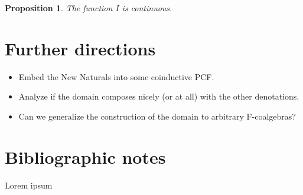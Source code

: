 \documentclass[a4paper]{article}
\newtheorem{thmIIsContinuous}[defNuF]{Proposition}
\begin{document}
\begin{thmIIsContinuous}

The function $I$ is continuous.

\end{thmIIsContinuous}

\section{Further directions}

\begin{itemize}
\item Embed the New Naturals into some coinductive PCF.
\item Analyze if the domain composes nicely (or at all) with the other
denotations.
\item Can we generalize the construction of the domain to arbitrary
F-coalgebras?
\end{itemize}

\section{Bibliographic notes}

Lorem ipsum \cite{Pierce1991} \cite{Gunter1992} \cite{Bird1997}
\cite{Mitchell1996} \cite{Allison1986} \cite{Capretta2002}



\end{document}

